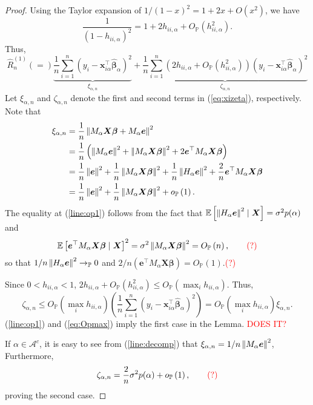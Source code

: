 \documentclass[12pt, letter paper]{article}
\newcommand{\1}{\mathmybb{1}}
\newcommand{\0}{\emptyset}
\newcommand{\prob}{\mathbb{P}}
\newcommand{\Ep}[1]{\mathbb{E}\left[ #1 \right]}
\newcommand{\paren}[1]{\left(#1 \right)}
\newcommand{\norm}[1]{\left|\hspace{-1pt}\left|#1 \right|\hspace{-1pt}\right|}
\newcommand{\normsq}[1]{\norm{#1}^{2}}
\newcommand{\Acal}{\mathcal{A}}
\newcommand{\X}{\boldsymbol{X}}
\newcommand{\x}{\boldsymbol{x}}
\newcommand{\e}{\boldsymbol{e}}
\newcommand{\bbeta}{\boldsymbol{\beta}}
\newcommand{\bbetahat}{\boldsymbol{\hat{\beta}}}
\newcommand{\lev}{h_{ii,\alpha}}
\newcommand{\loocv}[1]{\hat{R}^{(1)}_{n}\paren{#1}}
\newcommand{\op}[1]{o_{\prob}\paren{#1}}
\newcommand{\Op}[1]{O_{\prob}\paren{#1}}
\begin{document}
\begin{proof}
    Using the Taylor expansion of \(1/{(1-x)}^{2} = 1+2x + O(x^{2})\), we have
    \[\frac{1}{\paren{1-\lev}^{2}} = 1 + 2\lev + \Op{\lev^{2}}.\]
    Thus,
    \begin{equation}
        \label{eq:xizeta}
        \loocv = \underbrace{\frac{1}{n}\sum_{i=1}^{n}\paren{y_{i}-\x_{i\alpha}^{\top}\bbetahat_{\alpha}}^{2}}_{\xi_{\alpha,n}} + \underbrace{\frac{1}{n}\sum_{i=1}^{n}\paren{2\lev + \Op{\lev^{2}}}\paren{y_{i}-\x_{i\alpha}^{\top}\bbetahat_{\alpha}}^{2}}_{\zeta_{\alpha,n}}
    \end{equation}
    Let \(\xi_{\alpha,n}\) and \(\zeta_{\alpha,n}\) denote the first and second terms in (\ref{eq:xizeta}), respectively. Note that
    \begin{align}
        \notag\xi_{\alpha,n} &= \frac{1}{n}\normsq{M_{\alpha}\X\bbeta + M_{\alpha}\e}\\
        \label{line:decomp}&= \frac{1}{n}\paren{\normsq{M_{\alpha}\e} + \normsq{M_{\alpha}\X\bbeta} + 2 \e^{\top}M_{\alpha}\X\bbeta}\\
        \notag&=\frac{1}{n}\normsq{\e} + \frac{1}{n}\normsq{M_{\alpha}\X\bbeta} + \frac{1}{n}\normsq{H_{\alpha}\e} + \frac{2}{n}\e^{\top}M_{\alpha}\X\bbeta\\
        \label{line:op1}&= \frac{1}{n}\normsq{\e} + \frac{1}{n}\normsq{M_{\alpha}\X\bbeta} + \op{1}.
    \end{align}
    The equality at (\ref{line:op1}) follows from the fact that \(\Ep{\normsq{H_{\alpha}\e}\mid\X} = \sigma^{2}p(\alpha)\) and 
    \[\Ep{\e^{\top}M_{\alpha}\X\bbeta\mid\X}^{2} = \sigma^{2}\normsq{M_{\alpha}\X\bbeta} = \Op{n},\qquad\textcolor{red}{(?)}\]
    so that \(1/n\normsq{H_{\alpha}\e}\to_{\prob}0\) and \(2/n\paren{\e^{\top}M_{\alpha}\X\bbeta}=\Op{1}\).\quad\textcolor{red}{(?)} %

    Since \(0<\lev<1\), \(2\lev + \Op{\lev^{2}}\leq\Op{\max_{i}\lev}\). Thus,
    \begin{equation}
        \label{eq:Opmax}
        \zeta_{\alpha,n}\leq\Op{\max_{i}\lev}\paren{\frac{1}{n}\sum_{i=1}^{n}\paren{y_{i} - \x_{i\alpha}^{\top}\bbetahat_{\alpha}}^{2}} = \Op{\max_{i}\lev}\xi_{\alpha,n}.
    \end{equation}
    (\ref{line:op1}) and (\ref{eq:Opmax}) imply the first case in the Lemma.\textcolor{red}{ DOES IT?}

    If \(\alpha\in\Acal^{c}\), it is easy to see from (\ref{line:decomp}) that \(\xi_{\alpha,n} = 1/n\normsq{M_{\alpha}\e}\), Furthermore,
    \[\zeta_{\alpha,n} = \frac{2}{n}\sigma^{2}p(\alpha) + \op{1},\qquad\textcolor{red}{(?)}\]
    proving the second case.
\end{proof}
\end{document}
